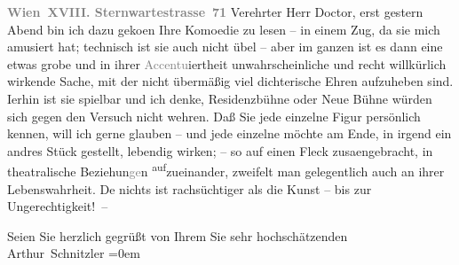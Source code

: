 \pstart
           \textcolor{gray}{\textbf{Wien XVIII. Sternwartestrasse 71}}\pend
           \vspace{0.5em}
\pstart
           Verehrter Herr Doctor, erst gestern Abend bin ich dazu geko{\geminationm}en Ihre Komoedie zu lesen – in einem Zug, da sie mich amusiert hat;
               technisch ist sie auch nicht übel – aber im ganzen ist es dann eine etwas grobe und
               in ihrer \textcolor{gray}{Accentu}iertheit unwahrscheinliche und recht willkürlich
               wirkende Sache, mit der nicht übermäßig \introOben{}viel\introOben{} dichterische
               Ehren aufzuheben sind. I{\geminationm}erhin ist sie spielbar und ich
               denke, Residenzbühne oder Neue Bühne würden sich gegen den Versuch nicht wehren. Daß Sie
               jede einzelne Figur persönlich kennen, {\pb}will ich gerne
               glauben – und jede einzelne möchte am Ende, in irgend ein andres Stück gestellt,
               lebendig wirken; – so auf einen Fleck zusa{\geminationm}engebracht,
               in theatralische Beziehun\textcolor{gray}{ge}n \substVorne{}\textsuperscript{auf}\substDazwischen{}zu\substHinten{}einander, zweifelt man gelegentlich auch an ihrer Lebenswahrheit. De{\geminationn} nichts ist rachsüchtiger als die Kunst – bis zur
               Ungerechtigkeit! –\pend
           
\pstart
           Seien Sie herzlich gegrüßt von Ihrem Sie sehr hochschätzenden{\\[\baselineskip]}\spacefill\mbox{Arthur Schnitzler}\pend
           \leftskip=0em{}\endnumbering{}  \newcommand{\dateiname}{L02213}\newcommand{\titel}{Arthur Schnitzler an Robert Adam, 11. 7. 1915}\newcommand{\editorInnen}{Martin Anton Müller und Gerd-Hermann Susen}
